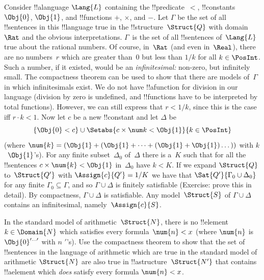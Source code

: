 \begin{ex}
Consider !!a{language} $\Lang{L}$ containing the !!{predicate}~$<$,
!!{constant}s $\Obj{0}$, $\Obj{1}$, and !!{function}s $+$, $\times$, and
$-$. Let $\Gamma$ be the set of all !!{sentence}s in this
!!{language} true in the !!{structure}~$\Struct{Q}$ with domain~$\Rat$ and the obvious
interpretations.  $\Gamma$~is the set of all !!{sentence}s
of~$\Lang{L}$ true about the rational numbers. Of course, in~$\Rat$
(and even in~$\Real$), there are no numbers~$r$ which are greater than~$0$
but less than $1/k$ for all $k \in \PosInt$.  Such a number, if it
existed, would be an \emph{infinitesimal:} non-zero, but infinitely
small.  The compactness theorem can be used to show that there are 
models of~$\Gamma$ in which infinitesimals exist. We do not have 
!!a{function} for division in our language (division by zero is 
undefined, and !!{function}s have to be interpreted by total functions).
However, we can still express that $r < 1/k$, since this is the case iff
$r \cdot k < 1$. Now let $c$ be a new !!{constant} and let $\Delta$ be 
\[
\{\Obj{0} < c\}
\cup \Setabs{ c \times \num k < \Obj{1} }{k \in \PosInt}
\]
(where $\num{k} = (\Obj{1} + (\Obj{1} + \dots + (\Obj{1} +
\Obj{1})\dots))$ with $k$~$\Obj{1}$'s). For any finite
subset~$\Delta_0$ of~$\Delta$ there is a~$K$ such that for all the
!!{sentence}s $c \times \num{k} < \Obj{1}$ in~$\Delta_0$ have $k < K$.
If we expand $\Struct{Q}$ to~$\Struct{Q'}$ with $\Assign{c}{Q'} = 1/K$
we have that $\Sat{Q'}{\Gamma_0 \cup \Delta_0}$ for any finite
$\Gamma_0 \subseteq \Gamma$, and so $\Gamma \cup \Delta$ is finitely
satisfiable (Exercise: prove this in detail). By compactness, $\Gamma
\cup \Delta$ is satisfiable. Any model~$\Struct{S}$ of $\Gamma \cup
\Delta$ contains an infinitesimal, namely~$\Assign{c}{S}$.
\end{ex}



\begin{prob}
In the standard model of arithmetic~$\Struct{N}$, there is no
!!{element}~$k \in \Domain{N}$ which satisfies every formula~$\num{n}
< x$ (where $\num{n}$ is $\Obj{0}^{\prime\dots\prime}$ with $n$
$\prime$'s).  Use the compactness theorem to show that the set of
!!{sentence}s in the language of arithmetic which are true in the standard
model of arithmetic $\Struct{N}$ are also true in
!!a{structure}~$\Struct{N'}$ that contains !!a{element} which
\emph{does} satisfy every formula $\num{n} < x$.
\end{prob}



